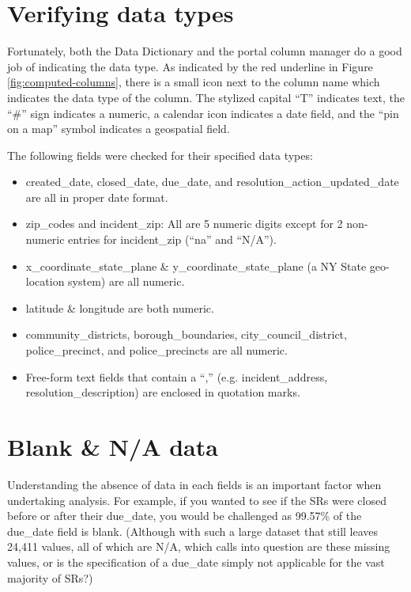 \documentclass[12pt, titlepage]{article}
\begin{document}
	
\section{Verifying data types}
Fortunately, both the Data Dictionary and the portal column manager do a good job of indicating the data type.
As indicated by the red underline in Figure \ref{fig:computed-columns}, there is a small icon next to the column name 
which indicates the data type of the column. The stylized capital ``T'' indicates text, the ``\#'' sign indicates 
a numeric, a calendar icon indicates a date field, and the ``pin on a map'' symbol indicates a geospatial field. 
	
The following fields were checked for their specified data types:
	
\begin{itemize}
	\item created\_date, closed\_date, due\_date, and resolution\_action\_updated\_date are all in proper date format.
	\item zip\_codes and incident\_zip: All are 5 numeric digits except for 2 non-numeric entries for incident\_zip (``na'' and ``N/A'').
	\item x\_coordinate\_state\_plane \&  y\_coordinate\_state\_plane (a NY State geo-location system) are all numeric.
	\item latitude \& longitude are both numeric.
	\item community\_districts, borough\_boundaries, city\_council\_district, police\_precinct, and police\_precincts are all numeric.
	\item Free-form text fields that contain a ``,'' (e.g. incident\_address, resolution\_description) are enclosed in quotation marks.
\end{itemize}	
	

\section{Blank \& N/A data}

Understanding the absence of data in each fields is an important factor when undertaking analysis. For example, if you wanted to see if the SRs were
closed before or after their due\_date, you would be challenged as 99.57\% of the due\_date field is blank. (Although with such a large dataset
that still leaves 24,411 values, all of which are N/A, which calls into question are these missing values, or is the specification of a
due\_date simply not applicable for the vast majority of SRs?)
\end{document}
